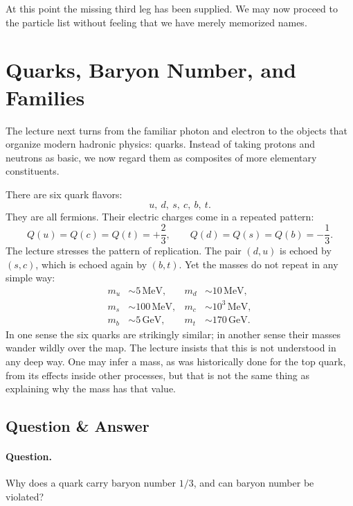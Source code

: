 At this point the missing third leg has been supplied. We may now proceed to the particle list without feeling that we have merely memorized names.

\section{Quarks, Baryon Number, and Families}

The lecture next turns from the familiar photon and electron to the objects that organize modern hadronic physics: quarks. Instead of taking protons and neutrons as basic, we now regard them as composites of more elementary constituents.

There are six quark flavors:
\begin{equation}
u,\ d,\ s,\ c,\ b,\ t.
\end{equation}
They are all fermions. Their electric charges come in a repeated pattern:
\begin{equation}
Q(u)=Q(c)=Q(t)=+\frac23,
\qquad
Q(d)=Q(s)=Q(b)=-\frac13.
\end{equation}
The lecture stresses the pattern of replication. The pair \((d,u)\) is echoed by \((s,c)\), which is echoed again by \((b,t)\). Yet the masses do not repeat in any simple way:
\begin{align}
m_u &\sim 5\,\mathrm{MeV}, &
m_d &\sim 10\,\mathrm{MeV},\\
m_s &\sim 100\,\mathrm{MeV}, &
m_c &\sim 10^3\,\mathrm{MeV},\\
m_b &\sim 5\,\mathrm{GeV}, &
m_t &\sim 170\,\mathrm{GeV}.
\end{align}
In one sense the six quarks are strikingly similar; in another sense their masses wander wildly over the map. The lecture insists that this is not understood in any deep way. One may infer a mass, as was historically done for the top quark, from its effects inside other processes, but that is not the same thing as explaining why the mass has that value.

\subsection{Question \& Answer}

\paragraph{Question.} Why does a quark carry baryon number \(1/3\), and can baryon number be violated?

